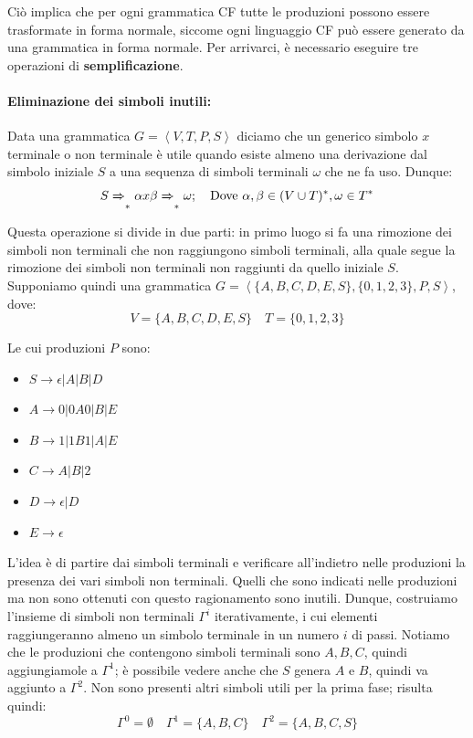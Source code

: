 \noindent Ciò implica che per ogni grammatica CF tutte le produzioni possono essere trasformate in forma normale, siccome ogni linguaggio CF può essere
generato da una grammatica in forma normale. Per arrivarci, è necessario eseguire tre operazioni di \textbf{semplificazione}.

\paragraph{Eliminazione dei simboli inutili:} Data una grammatica $G = \left<V, T, P, S\right>$ diciamo che un generico simbolo $x$ terminale o non
terminale è utile quando esiste almeno una derivazione dal simbolo iniziale $S$ a una sequenza di simboli terminali $\omega$ che ne fa uso. Dunque: \[
    S\xRightarrow{}_* \alpha x\beta \xRightarrow{}_* \omega;\quad \text{Dove } \alpha, \beta \in (V\cup T)^*, \omega\in T^*
\]

\noindent Questa operazione si divide in due parti: in primo luogo si fa una rimozione dei simboli non terminali che non raggiungono simboli terminali,
alla quale segue la rimozione dei simboli non terminali non raggiunti da quello iniziale $S$. Supponiamo quindi una grammatica
$G = \left<\{A,B,C,D,E,S\}, \{0,1,2,3\}, P, S\right>$, dove: \[
    V = \{A,B,C,D,E,S\}\quad T = \{0,1,2,3\}
\]

\noindent Le cui produzioni $P$ sono: \begin{itemize}
    \item $S \to \epsilon|A|B|D$
    \item $A \to 0|0A0|B|E$
    \item $B \to 1|1B1|A|E$
    \item $C \to A|B|2$
    \item $D \to \epsilon|D$
    \item $E \to \epsilon$
\end{itemize}

\noindent L'idea è di partire dai simboli terminali e verificare all'indietro nelle produzioni la presenza dei vari simboli non terminali. Quelli che
sono indicati nelle produzioni ma non sono ottenuti con questo ragionamento sono inutili. Dunque, costruiamo l'insieme di simboli non terminali
$\Gamma^i$ iterativamente, i cui elementi raggiungeranno almeno un simbolo terminale in un numero $i$ di passi. Notiamo che le produzioni che contengono
simboli terminali sono $A, B, C$, quindi aggiungiamole a $\Gamma^1$; è possibile vedere anche che $S$ genera $A$ e $B$, quindi va aggiunto a $\Gamma^2$.
Non sono presenti altri simboli utili per la prima fase; risulta quindi: \[
    \Gamma^0 = \emptyset\quad \Gamma^1 = \{A, B, C\}\quad \Gamma^2 = \{A, B, C, S\}
\]

